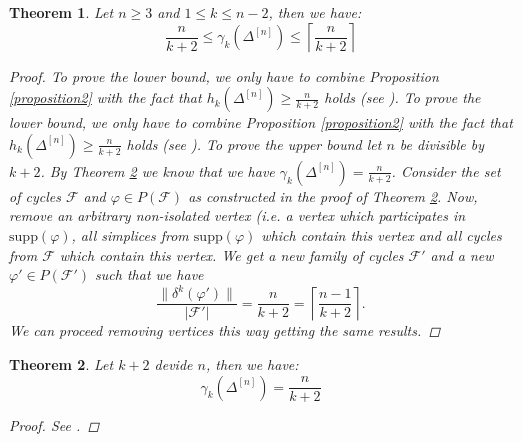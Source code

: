\documentclass{article}
\newcommand{\supp}{\mathrm{supp}}
\newtheorem{thm}{Theorem}[section]
\begin{document}
\begin{thm}\label{theorem1}
Let $n\geq 3$ and $1\leq k\leq n-2$, then we have:
\[
\frac{n}{k+2}\leq\gamma_k(\Delta^{[n]})\leq\left\lceil\frac{n}{k+2}\right\rceil
\]
\begin{proof}
To prove the lower bound, we only have to combine Proposition \ref{proposition2} with the fact that $h_k(\Delta^{[n]})\geq\frac{n}{k+2}$ holds (see \cite{2}). To prove the lower bound, we only have to combine Proposition \ref{proposition2} with the fact that $h_k(\Delta^{[n]})\geq\frac{n}{k+2}$ holds (see \cite{2}). To prove the upper bound let $n$ be divisible by $k+2$. By Theorem \ref{theorem2} we know that we have $\gamma_k(\Delta^{[n]})=\frac{n}{k+2}$. Consider the set of cycles $\mathcal{F}$ and $\varphi\in P(\mathcal{F})$ as constructed in the proof of Theorem \ref{theorem2}. Now, remove an arbitrary non-isolated vertex (i.e. a vertex which participates in $\supp(\varphi)$, all simplices from $\supp(\varphi)$ which contain this vertex and all cycles from $\mathcal{F}$ which contain this vertex. We get a new family of cycles $\mathcal{F}'$ and a new $\varphi'\in P(\mathcal{F}')$ such that we have
\[
\frac{\|\delta^k(\varphi')\|}{|\mathcal{F}'|}=\frac{n}{k+2}=\left\lceil\frac{n-1}{k+2}\right\rceil.
\]
We can proceed removing vertices this way getting the same results.
\end{proof}
\end{thm}

\begin{thm}\label{theorem2}
Let $k+2$ devide $n$, then we have:
\[
\gamma_k(\Delta^{[n]})=\frac{n}{k+2}
\]
\begin{proof}
See \cite{1}.
\end{proof}
\end{thm}
\end{document}
